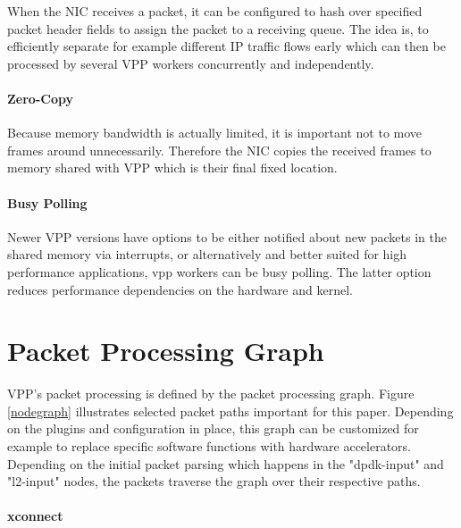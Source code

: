When the NIC receives a packet, it can be configured to hash over
specified packet header fields to assign the packet to a receiving
queue. The idea is, to efficiently separate for example different IP
traffic flows early which can then be processed by several VPP workers
concurrently and independently. \cite{linguaglossa2017high}

\paragraph{Zero-Copy}

Because memory bandwidth is actually limited, it is important not to
move frames around unnecessarily. Therefore the NIC copies the
received frames to memory shared with VPP which is their final fixed
location. \cite{linguaglossa2017high}

\paragraph{Busy Polling}

Newer VPP versions have options to be either notified about new
packets in the shared memory via interrupts, or alternatively and
better suited for high performance applications, \Ac{vpp} workers can
be busy polling. The latter option reduces performance dependencies on
the hardware and kernel. \cite{vppdocs:rxmodes}


\section{Packet Processing Graph}


VPP's packet processing is defined by the packet processing graph.
Figure \ref{nodegraph} illustrates selected packet paths important for
this paper. Depending on the plugins and configuration in place, this
graph can be customized for example to replace specific software
functions with hardware accelerators. Depending on the initial packet
parsing which happens in the "dpdk-input" and "l2-input" nodes, the
packets traverse the graph over their respective paths.

\paragraph{xconnect}

